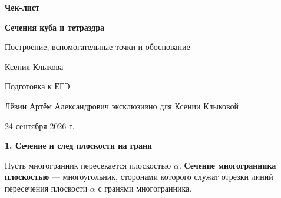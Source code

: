 \documentclass[a4paper,12pt]{article}
\newcommand{\sectitle}[1]{%
  \vspace{0.55em}%
  {\Large\bfseries\color{darkaccent}#1\par}%
  \vspace{0.2em}%
  \noindent{\color{accent}\rule{\linewidth}{0.8pt}}%
  \vspace{0.45em}%
}
\newcommand{\important}[1]{{\bfseries\color{darkaccent}#1}}
\begin{document}

\begin{titlepage}
\thispagestyle{empty}
\centering

\vspace*{2.2cm}

{\Large\color{darkaccent}\textbf{Чек-лист}\par}

\vspace{0.8cm}

{\huge\bfseries Сечения куба и тетраэдра\par}

\vspace{0.35cm}

{\Large Построение, вспомогательные точки и обоснование\par}

\vspace{1.7cm}

{\large Ксения Клыкова\par}

\vspace{0.35cm}

{\normalsize Подготовка к ЕГЭ\par}

\vfill

{\normalsize
Лёвин Артём Александрович эксклюзивно для Ксении Клыковой
\par}

\vspace{0.35cm}

{\normalsize 24 сентября 2026 г.\par}


\end{titlepage}


\sectitle{1. Сечение и след плоскости на грани}

Пусть многогранник пересекается плоскостью $\alpha$.
\important{Сечение многогранника плоскостью} --- многоугольник, сторонами которого служат отрезки линий пересечения плоскости $\alpha$ с гранями многогранника.
\end{document}
